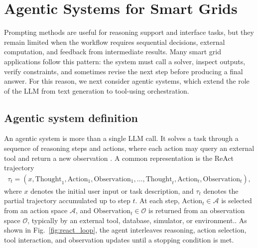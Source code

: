 \documentclass[journal,onecolumn]{IEEEtran} %
\begin{document}

\section{Agentic Systems for Smart Grids}
\label{sec:agents}

Prompting methods are useful for reasoning support and interface tasks, but they remain limited when the workflow requires sequential decisions, external computation, and feedback from intermediate results. Many smart grid applications follow this pattern: the system must call a solver, inspect outputs, verify constraints, and sometimes revise the next step before producing a final answer. For this reason, we next consider agentic systems, which extend the role of the LLM from text generation to tool-using orchestration.

\subsection{Agentic system definition}
An agentic system is more than a single LLM call. It solves a task through a sequence of reasoning steps and actions, where each action may query an external tool and return a new observation \cite{yao2023react}. A common representation is the ReAct trajectory
\begin{align}
\tau_t = (x,\text{Thought}_1,\text{Action}_1,\text{Observation}_1,\dots,
\text{Thought}_t,\text{Action}_t,\text{Observation}_t),
\end{align}
where {\(x\) denotes the initial user input or task description, and \(\tau_t\) denotes the partial trajectory accumulated up to step \(t\). At each step, \(\text{Action}_t \in \mathcal{A}\) is selected from an action space \(\mathcal{A}\), and \(\text{Observation}_t \in \mathcal{O}\) is returned from an observation space \(\mathcal{O}\), typically by an external tool, database, simulator, or environment.}. As shown in Fig.~\ref{fig:react_loop}, the agent interleaves reasoning, action selection, tool interaction, and observation updates until a stopping condition is met.
\end{document}
